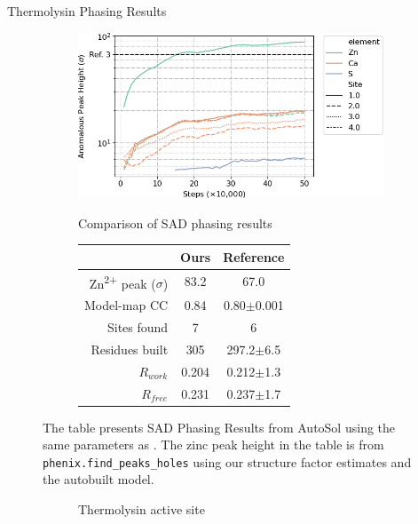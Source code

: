 \documentclass[final]{beamer}
\newlength{\colwidth}
\begin{document}
\begin{frame}[t]
\begin{columns}[t]
\begin{column}{\colwidth}
\begin{block}{Thermolysin Phasing Results}
\begin{figure}[]
\begin{subfigure}[t]{0.5\textwidth}
      \includegraphics[width=\textwidth]{figures/thermolysin/anom_peaks_annotated_trimmed.png}
    \end{subfigure}\hfill
    \begin{subfigure}[t]{0.45\textwidth}
      \centering
      Comparison of SAD phasing results \bigskip

      \bgroup
      \def\arraystretch{1.5}%
      \begin{tabular}{r|c|c}
            & Ours & Reference \cite{brewster_sad_2019} \\
            \hline
            Zn\textsuperscript{2+} peak ($\sigma$) & 83.2 & 67.0 \\
            Model-map CC & 0.84 & 0.80$\pm$0.001 \\
            Sites found & 7 & 6 \\
            Residues built & 305 & 297.2$\pm$6.5 \\
            $R_{work}$ & 0.204 & 0.212$\pm$1.3 \\
            $R_{free}$ & 0.231 & 0.237$\pm$1.7 \\
      \end{tabular}
      \egroup
      \label{tab:phasing}
    \end{subfigure}
      \RaggedRight
      \bigskip
        
      The table presents SAD Phasing Results from AutoSol \cite{terwilliger_decision-making_2009} using the same parameters as \cite{brewster_sad_2019}. The zinc peak height in the table is from \texttt{phenix.find\_peaks\_holes} using our structure factor estimates and the autobuilt model. 
  \end{figure}
  
  \begin{figure}[]
    \begin{subfigure}[t]{0.45\textwidth}
      \centering
      Thermolysin active site\bigskip


\end{subfigure}
\end{figure}
\end{block}
\end{column}
\end{columns}
\end{frame}
\end{document}
